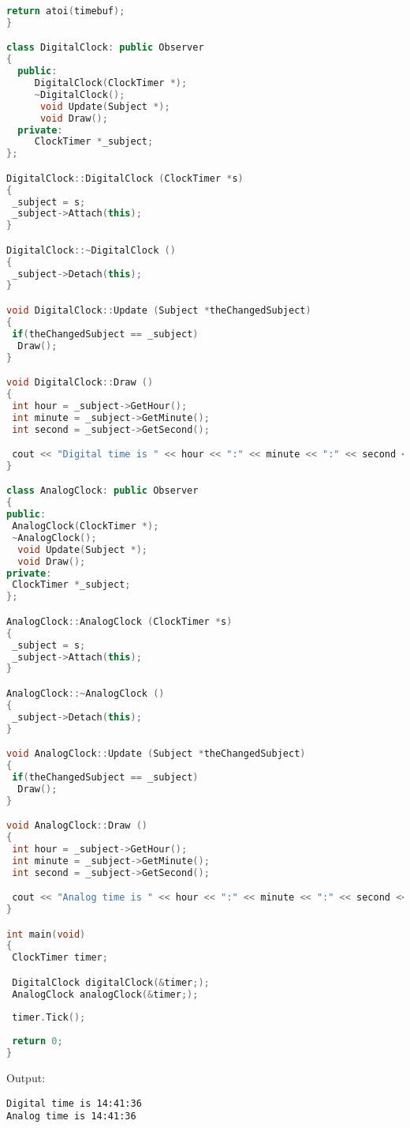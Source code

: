 \documentclass{book}
\begin{document}
\begin{lstlisting}[caption={Observer Pattern - sample 1, GOF}, language=c++]
 return atoi(timebuf); 
}

class DigitalClock: public Observer 
{ 
  public: 
     DigitalClock(ClockTimer *);  
     ~DigitalClock();   
      void Update(Subject *);   
      void Draw();     
  private: 
     ClockTimer *_subject;  
}; 

DigitalClock::DigitalClock (ClockTimer *s) 
{ 
 _subject = s; 
 _subject->Attach(this); 
} 

DigitalClock::~DigitalClock () 
{ 
 _subject->Detach(this); 
} 

void DigitalClock::Update (Subject *theChangedSubject) 
{ 
 if(theChangedSubject == _subject) 
  Draw(); 
} 

void DigitalClock::Draw () 
{ 
 int hour = _subject->GetHour(); 
 int minute = _subject->GetMinute(); 
 int second = _subject->GetSecond(); 

 cout << "Digital time is " << hour << ":" << minute << ":" << second << endl;           
}

class AnalogClock: public Observer 
{ 
public: 
 AnalogClock(ClockTimer *);  
 ~AnalogClock();    
  void Update(Subject *);  
  void Draw();     
private: 
 ClockTimer *_subject;   
}; 

AnalogClock::AnalogClock (ClockTimer *s) 
{ 
 _subject = s; 
 _subject->Attach(this); 
} 

AnalogClock::~AnalogClock () 
{ 
 _subject->Detach(this); 
} 

void AnalogClock::Update (Subject *theChangedSubject) 
{ 
 if(theChangedSubject == _subject) 
  Draw(); 
} 

void AnalogClock::Draw () 
{ 
 int hour = _subject->GetHour(); 
 int minute = _subject->GetMinute(); 
 int second = _subject->GetSecond(); 

 cout << "Analog time is " << hour << ":" << minute << ":" << second << endl; 
}

int main(void) 
{ 
 ClockTimer timer; 

 DigitalClock digitalClock(&timer;); 
 AnalogClock analogClock(&timer;); 
  
 timer.Tick();  
  
 return 0; 
}
\end{lstlisting}
Output:
\begin{verbatim}
Digital time is 14:41:36
Analog time is 14:41:36
\end{verbatim}
\end{document}
